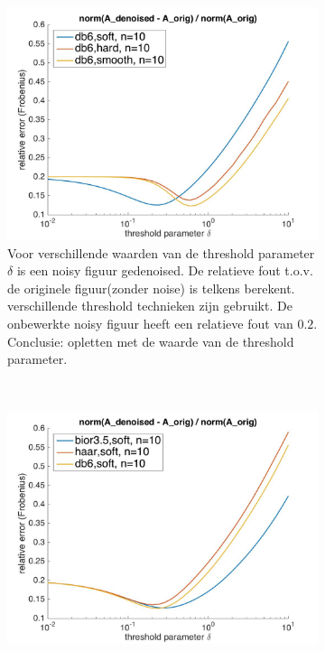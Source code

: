 \begin{figure}
    \centering
    \begin{subfigure}[b]{0.7\textwidth}
        \includegraphics[width=\textwidth]{../src/denoising/denoised_err_threskinds}
        \caption{Voor verschillende waarden van de threshold parameter $\delta$ is een noisy figuur gedenoised. De relatieve fout t.o.v. de originele figuur(zonder noise) is telkens berekent. verschillende threshold technieken zijn gebruikt. De onbewerkte noisy figuur heeft een relatieve fout van $0.2$. Conclusie: opletten met de waarde van de threshold parameter.}
        \label{fig:tiger}
    \end{subfigure}
    ~ %
    \begin{subfigure}[b]{0.7\textwidth}
        \includegraphics[width=\textwidth]{../src/denoising/denoised_err_wavekinds}

\end{subfigure}
\end{figure}
